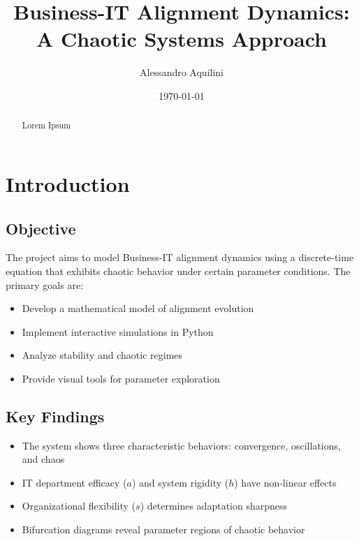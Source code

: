 \documentclass[a4paper, 11pt]{article}
\title{Business-IT Alignment Dynamics: A Chaotic Systems Approach}
\author{Alessandro Aquilini}
\date{\today}
\begin{document}
\pagestyle{empty}
\raggedright     %

\maketitle

\begin{abstract}
	Lorem Ipsum
\end{abstract}

\tableofcontents

\section{Introduction}
\subsection{Objective}
The project aims to model Business-IT alignment dynamics using a discrete-time equation that exhibits chaotic behavior under certain parameter conditions. The primary goals are:

\begin{itemize}
	\item Develop a mathematical model of alignment evolution
	\item Implement interactive simulations in Python
	\item Analyze stability and chaotic regimes
	\item Provide visual tools for parameter exploration
\end{itemize}

\subsection{Key Findings}
\begin{itemize}
	\item The system shows three characteristic behaviors: convergence, oscillations, and chaos
	\item IT department efficacy ($a$) and system rigidity ($h$) have non-linear effects
	\item Organizational flexibility ($s$) determines adaptation sharpness
	\item Bifurcation diagrams reveal parameter regions of chaotic behavior
\end{itemize}
\end{document}
